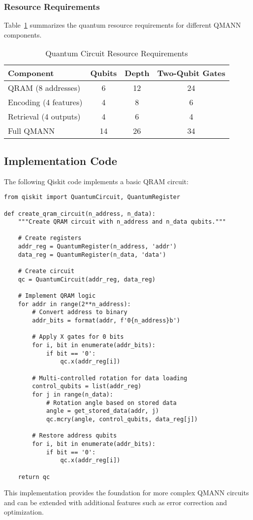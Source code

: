 \subsubsection{Resource Requirements}

Table~\ref{tab:circuit_resources} summarizes the quantum resource requirements for different QMANN components.

\begin{table}[htbp]
    \centering
    \caption{Quantum Circuit Resource Requirements}
    \label{tab:circuit_resources}
    \begin{tabular}{lccc}
        \toprule
        Component & Qubits & Depth & Two-Qubit Gates \\
        \midrule
        QRAM (8 addresses) & 6 & 12 & 24 \\
        Encoding (4 features) & 4 & 8 & 6 \\
        Retrieval (4 outputs) & 4 & 6 & 4 \\
        Full QMANN & 14 & 26 & 34 \\
        \bottomrule
    \end{tabular}
\end{table}

\subsection{Implementation Code}

The following Qiskit code implements a basic QRAM circuit:

\begin{verbatim}
from qiskit import QuantumCircuit, QuantumRegister

def create_qram_circuit(n_address, n_data):
    """Create QRAM circuit with n_address and n_data qubits."""
    
    # Create registers
    addr_reg = QuantumRegister(n_address, 'addr')
    data_reg = QuantumRegister(n_data, 'data')
    
    # Create circuit
    qc = QuantumCircuit(addr_reg, data_reg)
    
    # Implement QRAM logic
    for addr in range(2**n_address):
        # Convert address to binary
        addr_bits = format(addr, f'0{n_address}b')
        
        # Apply X gates for 0 bits
        for i, bit in enumerate(addr_bits):
            if bit == '0':
                qc.x(addr_reg[i])
        
        # Multi-controlled rotation for data loading
        control_qubits = list(addr_reg)
        for j in range(n_data):
            # Rotation angle based on stored data
            angle = get_stored_data(addr, j)
            qc.mcry(angle, control_qubits, data_reg[j])
        
        # Restore address qubits
        for i, bit in enumerate(addr_bits):
            if bit == '0':
                qc.x(addr_reg[i])
    
    return qc
\end{verbatim}

This implementation provides the foundation for more complex QMANN circuits and can be extended with additional features such as error correction and optimization.
